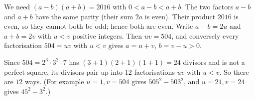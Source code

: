 We need $(a-b)(a+b)=2016$ with $0<a-b<a+b$. The two factors $a-b$ and $a+b$ have the same parity (their sum $2a$ is even). Their product $2016$ is even, so they cannot both be odd; hence both are even. Write $a-b=2u$ and $a+b=2v$ with $u<v$ positive integers. Then $uv=504$, and conversely every factorisation $504=uv$ with $u<v$ gives $a=u+v$, $b=v-u>0$.

Since $504=2^3\cdot3^2\cdot7$ has $(3+1)(2+1)(1+1)=24$ divisors and is not a perfect square, its divisors pair up into $12$ factorisations $uv$ with $u<v$. So there are $\boxed{12}$ ways. (For example $u=1,v=504$ gives $505^2-503^2$, and $u=21,v=24$ gives $45^2-3^2$.)

